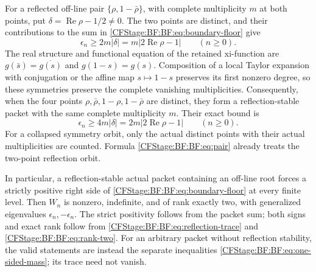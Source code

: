 For a reflected off-line pair
\(\{\rho,1-\bar\rho\}\), with complete multiplicity \(m\) at both
points, put \(\delta=\operatorname{Re}\rho-1/2\ne0\).
The two points are distinct, and their contributions to the sum
in \eqref{CFStage:BF:BF:eq:boundary-floor} give
\begin{equation}
\epsilon_n\ge2m|\delta|
 =m|2\operatorname{Re}\rho-1|
 \qquad(n\ge0).
\tag{BF.38}\label{CFStage:BF:BF:eq:pair}
\end{equation}
The real structure and functional equation of the retained
xi-function are \(g(\bar s)=\overline{g(s)}\) and \(g(1-s)=g(s)\).
Composition of a local Taylor expansion with conjugation or the
affine map \(s\mapsto1-s\) preserves its first nonzero degree, so
these symmetries preserve the complete vanishing multiplicities.
Consequently, when the four points
\(\rho,\bar\rho,1-\rho,1-\bar\rho\) are distinct, they form a
reflection-stable packet with the same complete multiplicity \(m\).
Their exact bound is
\begin{equation}
\epsilon_n\ge4m|\delta|
 =2m|2\operatorname{Re}\rho-1|
 \qquad(n\ge0).
\tag{BF.39}\label{CFStage:BF:BF:eq:quartet}
\end{equation}
For a collapsed symmetry orbit, only the actual distinct points
with their actual multiplicities are counted.  Formula
\eqref{CFStage:BF:BF:eq:pair} already treats the two-point reflection orbit.

In particular, a reflection-stable actual packet containing an
off-line root forces a strictly positive right side of
\eqref{CFStage:BF:BF:eq:boundary-floor} at every finite level.
Then \(W_n\) is nonzero, indefinite, and of rank exactly two,
with generalized eigenvalues \(\epsilon_n,-\epsilon_n\).
The strict positivity follows from the packet sum; both signs
and exact rank follow from \eqref{CFStage:BF:BF:eq:reflection-trace}
and \eqref{CFStage:BF:BF:eq:rank-two}.  For an arbitrary packet without
reflection stability, the valid statements are instead the
separate inequalities \eqref{CFStage:BF:BF:eq:one-sided-mass}; its trace
need not vanish.

